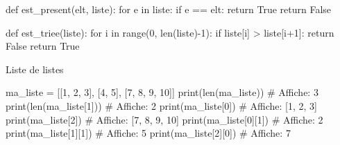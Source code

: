 	\begin{minipage}{0.48\linewidth}
\begin{easybox}{}
		\begin{CodePythontexAlt}[TaillePolice=\normalsize, Largeur=1\linewidth,Centre,PremLigne=1, Lignes=false]{}
def est_present(elt, liste):
	for e in liste:
		if e == elt:
			return True
	return False
		\end{CodePythontexAlt}
\end{easybox}
\end{minipage}\hfill
	\begin{minipage}{0.48\linewidth}
\begin{easybox}{}
		\begin{CodePythontexAlt}[TaillePolice=\normalsize, Largeur=1\linewidth,Centre,PremLigne=1, Lignes=false]{}
def est_triee(liste):
	for i in range(0, len(liste)-1):
		if liste[i] > liste[i+1]:
			return False
	return True
		\end{CodePythontexAlt}
\end{easybox}
\end{minipage}
			
\begin{easybox}{Liste de listes}{}

		\begin{CodePythontexAlt}[TaillePolice=\normalsize, Largeur=1\linewidth,Centre,PremLigne=1, Lignes=false]{}
ma_liste = [[1, 2, 3], [4, 5], [7, 8, 9, 10]]
print(len(ma_liste))	# Affiche: 3
print(len(ma_liste[1])) # Affiche: 2
print(ma_liste[0]) 		# Affiche: [1, 2, 3]
print(ma_liste[2])		# Affiche: [7, 8, 9, 10]
print(ma_liste[0][1]) 	# Affiche: 2
print(ma_liste[1][1]) 	# Affiche: 5
print(ma_liste[2][0]) 	# Affiche: 7
		\end{CodePythontexAlt}

		

\end{easybox}

\pagebreak

